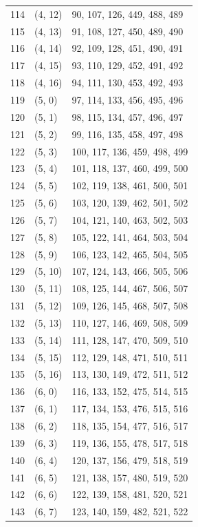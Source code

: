 \documentclass{article}
\begin{document}
\begin{longtable}{lll}
  114 & (4, 12) & 90, 107, 126, 449, 488, 489 \\
  115 & (4, 13) & 91, 108, 127, 450, 489, 490 \\
  116 & (4, 14) & 92, 109, 128, 451, 490, 491 \\
  117 & (4, 15) & 93, 110, 129, 452, 491, 492 \\
  118 & (4, 16) & 94, 111, 130, 453, 492, 493 \\
  119 & (5, 0) & 97, 114, 133, 456, 495, 496 \\
  120 & (5, 1) & 98, 115, 134, 457, 496, 497 \\
  121 & (5, 2) & 99, 116, 135, 458, 497, 498 \\
  122 & (5, 3) & 100, 117, 136, 459, 498, 499 \\
  123 & (5, 4) & 101, 118, 137, 460, 499, 500 \\
  124 & (5, 5) & 102, 119, 138, 461, 500, 501 \\
  125 & (5, 6) & 103, 120, 139, 462, 501, 502 \\
  126 & (5, 7) & 104, 121, 140, 463, 502, 503 \\
  127 & (5, 8) & 105, 122, 141, 464, 503, 504 \\
  128 & (5, 9) & 106, 123, 142, 465, 504, 505 \\
  129 & (5, 10) & 107, 124, 143, 466, 505, 506 \\
  130 & (5, 11) & 108, 125, 144, 467, 506, 507 \\
  131 & (5, 12) & 109, 126, 145, 468, 507, 508 \\
  132 & (5, 13) & 110, 127, 146, 469, 508, 509 \\
  133 & (5, 14) & 111, 128, 147, 470, 509, 510 \\
  134 & (5, 15) & 112, 129, 148, 471, 510, 511 \\
  135 & (5, 16) & 113, 130, 149, 472, 511, 512 \\
  136 & (6, 0) & 116, 133, 152, 475, 514, 515 \\
  137 & (6, 1) & 117, 134, 153, 476, 515, 516 \\
  138 & (6, 2) & 118, 135, 154, 477, 516, 517 \\
  139 & (6, 3) & 119, 136, 155, 478, 517, 518 \\
  140 & (6, 4) & 120, 137, 156, 479, 518, 519 \\
  141 & (6, 5) & 121, 138, 157, 480, 519, 520 \\
  142 & (6, 6) & 122, 139, 158, 481, 520, 521 \\
  143 & (6, 7) & 123, 140, 159, 482, 521, 522 \\

\end{longtable}
\end{document}
